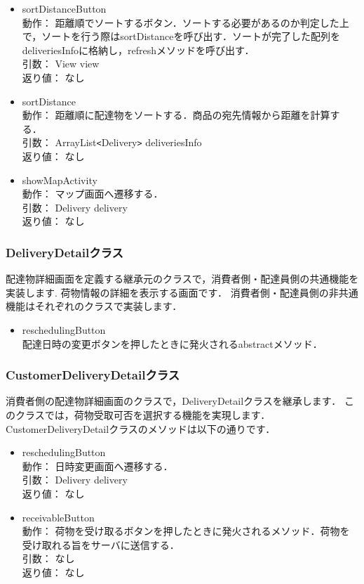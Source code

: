 \documentclass[a4j,titlepage]{jarticle}
\begin{document}
\begin{itemize}
  \item sortDistanceButton\\
  動作：  距離順でソートするボタン．ソートする必要があるのか判定した上で，ソートを行う際はsortDistanceを呼び出す．ソートが完了した配列をdeliveriesInfoに格納し，refreshメソッドを呼び出す．\\
  引数：   View view\\
  返り値：  なし

  \item sortDistance\\
  動作：  距離順に配達物をソートする．商品の宛先情報から距離を計算する．\\
  引数：  ArrayList\verb|<|Delivery\verb|>| deliveriesInfo\\
  返り値：  なし

  \item showMapActivity\\
  動作：  マップ画面へ遷移する．\\
  引数：  Delivery delivery\\
  返り値：  なし
\end{itemize}

\subsubsection{DeliveryDetailクラス}
配達物詳細画面を定義する継承元のクラスで，消費者側・配達員側の共通機能を実装します.
荷物情報の詳細を表示する画面です．
 消費者側・配達員側の非共通機能はそれぞれのクラスで実装します．
 
\begin{itemize}
 \item reschedulingButton\\
 配達日時の変更ボタンを押したときに発火されるabstractメソッド．\\
\end{itemize}

\subsubsection{CustomerDeliveryDetailクラス}
消費者側の配達物詳細画面のクラスで，DeliveryDetailクラスを継承します．
このクラスでは，荷物受取可否を選択する機能を実現します．
CustomerDeliveryDetailクラスのメソッドは以下の通りです．
\begin{itemize}
 \item reschedulingButton\\
 動作： 日時変更画面へ遷移する．\\
 引数： Delivery delivery\\
 返り値： なし

 \item receivableButton\\
 動作： 荷物を受け取るボタンを押したときに発火されるメソッド．荷物を受け取れる旨をサーバに送信する．\\
 引数： なし\\
 返り値： なし
\end{itemize}
\end{document}
